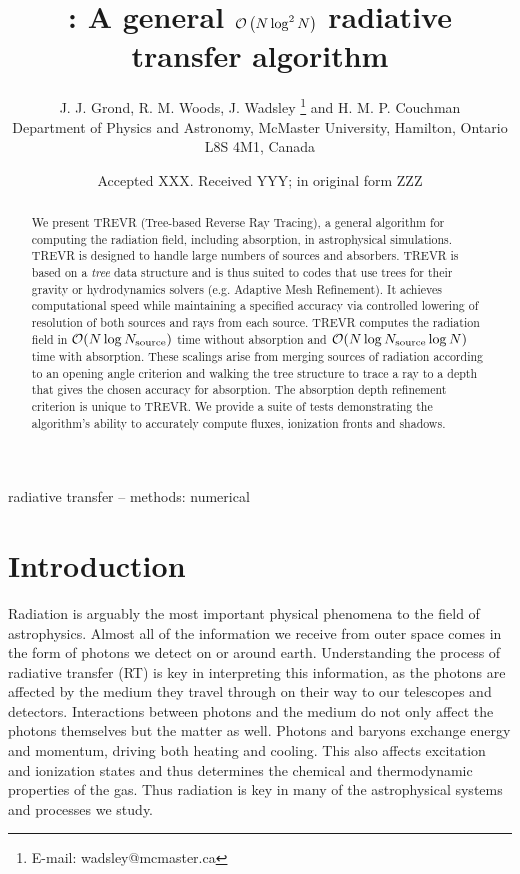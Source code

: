 \documentclass[fleq,usenatbib]{mnras}
\title[]{\acro{}: A general $\mathcal{O}\left(N\log^2N\right)$ radiative transfer algorithm}
\author[J. J. Grond et al.]{
J. J. Grond,
R. M. Woods,
J. Wadsley \thanks{E-mail:  wadsley@mcmaster.ca}
and H. M. P. Couchman
\\
Department of Physics and Astronomy, McMaster University, Hamilton, Ontario L8S
 4M1, Canada}
\date{Accepted XXX. Received YYY; in original form ZZZ}
\newcommand{\acro}{TREVR}
\newcommand{\NS}{N_{\rm source}}
\begin{document}
\label{firstpage}
\pagerange{\pageref{firstpage}--\pageref{lastpage}}
\maketitle

\begin{abstract}
We present \acro{} (Tree-based Reverse Ray Tracing), a general algorithm for 
computing the radiation field, including absorption, in astrophysical 
simulations. \acro{} is designed to handle large numbers of sources and 
absorbers. \acro{} is based on a \emph{tree} data structure and is thus suited 
to codes that use trees for their gravity or hydrodynamics solvers (e.g. 
Adaptive Mesh Refinement). It achieves computational speed while maintaining a 
specified accuracy via controlled lowering of resolution of both sources and rays from each source. \acro{} computes the radiation field in $\mathcal{O}(N 
\log \NS)$ time without absorption and $\mathcal{O}(N \log \NS \log{N})$ time 
with absorption.  These scalings arise from merging sources of radiation 
according to an opening angle criterion and walking the tree structure to 
trace a ray to a depth that gives the chosen accuracy for absorption. The 
absorption depth refinement criterion is unique to \acro{}. We provide a suite 
of tests demonstrating the algorithm's ability to accurately compute fluxes, 
ionization fronts and shadows.   

\end{abstract}

\begin{keywords}
radiative transfer -- methods: numerical
\end{keywords}



\section{Introduction}\label{sec:intr}
Radiation is arguably the most important physical phenomena to the field of
astrophysics. Almost all of the information we receive from outer space comes 
in the form of photons we detect on or around earth. Understanding the process 
of radiative transfer (RT) is key in interpreting this information, as the 
photons are affected by the medium they travel through on their way to our 
telescopes and detectors. Interactions between photons and the medium do not 
only affect the photons themselves but the matter as well. Photons and baryons 
exchange energy and momentum, driving both heating and cooling. This also 
affects excitation and ionization states and thus determines the chemical and 
thermodynamic properties of the gas. Thus radiation is key in many of the 
astrophysical systems and processes we study.
\end{document}
